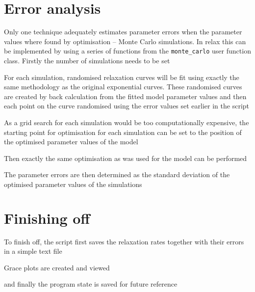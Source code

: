 



\section{Error analysis}

Only one technique adequately estimates parameter errors when the parameter values where found by optimisation -- Monte Carlo simulations.  In relax this can be implemented by using a series of functions from the \texttt{monte\_carlo} user function class.  Firstly the number of simulations needs to be set


For each simulation, randomised relaxation curves will be fit using exactly the same methodology as the original exponential curves.  These randomised curves are created by back calculation from the fitted model parameter values and then each point on the curve randomised using the error values set earlier in the script


As a grid search for each simulation would be too computationally expensive, the starting point for optimisation for each simulation can be set to the position of the optimised parameter values of the model


Then exactly the same optimisation as was used for the model can be performed


The parameter errors are then determined as the standard deviation of the optimised parameter values of the simulations





\section{Finishing off}

To finish off, the script first saves the relaxation rates together with their errors in a simple text file


Grace plots are created and viewed



and finally the program state is saved for future reference

